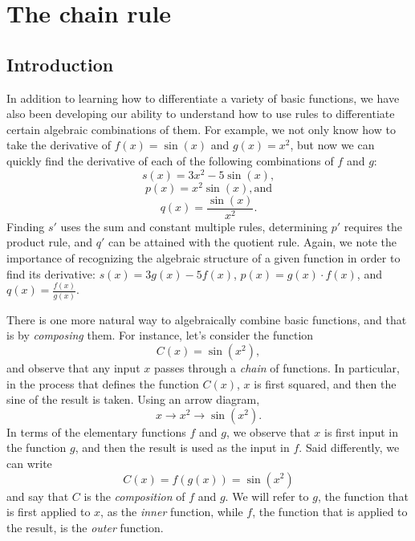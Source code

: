 \section{The chain rule} \label{S:2.5.Chain}

\vspace*{-14 pt}

\subsection*{Introduction}

In addition to learning how to differentiate a variety of basic functions, we have also been developing our ability to understand how to use rules to differentiate certain algebraic combinations of them.  For example, we not only know how to take the derivative of $f(x) = \sin(x)$ and $g(x) = x^2$, but now we can quickly find the derivative of each of the following combinations of $f$ and $g$:
$$s(x) = 3x^2 - 5\sin(x),$$
$$p(x) = x^2 \sin(x), \mbox{and}$$
$$q(x) = \frac{\sin(x)}{x^2}.$$
Finding $s'$ uses the sum and constant multiple rules, determining $p'$ requires the product rule, and $q'$ can be attained with the quotient rule.  Again, we note the importance of recognizing the algebraic structure of a given function in order to find its derivative:  $s(x) = 3g(x) - 5f(x)$, $p(x) = g(x) \cdot f(x)$, and $q(x) =\frac{f(x)}{g(x)}.$

There is one more natural way to algebraically combine basic functions, and that is by \emph{composing} them.  For instance, let's consider the function
$$C(x) = \sin(x^2),$$
and observe that any input $x$ passes through a \emph{chain} of functions.  In particular, in the process that defines the  function $C(x)$, $x$ is first squared, and then the sine of the result is taken.  Using an arrow diagram,
$$x \longrightarrow x^2 \longrightarrow \sin(x^2).$$
In terms of the elementary functions $f$ and $g$, we observe that $x$ is first input in the function $g$, and then the result is used as the input in $f$.  Said differently, we can write
$$C(x) = f(g(x)) = \sin(x^2)$$
and say that $C$ is the \emph{composition}  of $f$ and $g$.  We will refer to $g$, the function that is first applied to $x$, as the \emph{inner} function, while $f$, the function that is applied to the result, is the \emph{outer} function.

